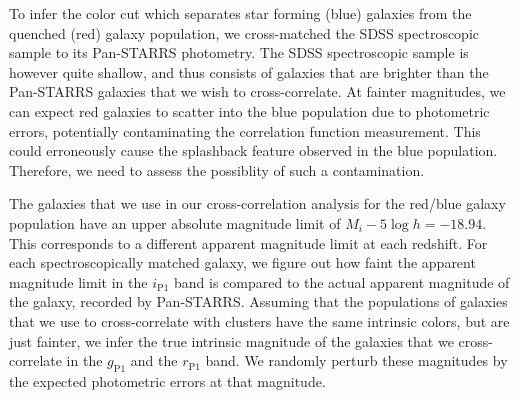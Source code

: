 \documentclass[iop, apjl, twocolappendix, numberedappendix]{emulateapj}
\begin{document}

To infer the color cut which separates star forming (blue) galaxies from the
quenched (red) galaxy population, we cross-matched the SDSS spectroscopic
sample to its Pan-STARRS photometry. 
The SDSS spectroscopic sample is however quite shallow, 
and thus consists of galaxies that are brighter than the Pan-STARRS 
galaxies that we wish to cross-correlate. At fainter magnitudes, we can 
expect red galaxies to scatter into the blue population 
due to photometric errors, potentially contaminating the
correlation function measurement. This could erroneously cause the
splashback feature observed in the blue population. Therefore, we
need to assess the possiblity of such a contamination. 


The galaxies that we use in our cross-correlation analysis for the red/blue
galaxy population have an upper absolute magnitude limit of $M_{i}-5\log h=-18.94$. This
corresponds to a different apparent magnitude limit at each redshift.
For each spectroscopically matched galaxy, we figure out how faint the
apparent magnitude limit in the $i_{\mathrm{P1}}$ band is compared to the actual
apparent magnitude of the galaxy, recorded by Pan-STARRS. Assuming that the populations of
galaxies that we use to cross-correlate with clusters have the same
intrinsic colors, but are just fainter, we infer the true
intrinsic magnitude of the galaxies that we cross-correlate in the
$g_{\mathrm{P1}}$ and the $r_{\mathrm{P1}}$ band. We randomly perturb these magnitudes 
by the expected photometric errors at that magnitude.
\end{document}

